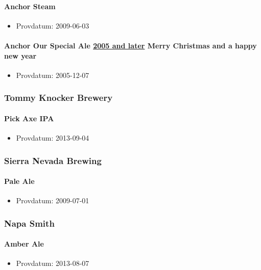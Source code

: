\documentclass[11pt]{article}
\begin{document}
\paragraph{Anchor Steam}
\label{sec:org35a39a7}
\begin{itemize}
\item Provdatum: 2009-06-03
\end{itemize}
\paragraph{Anchor Our Special Ale \underline{2005 and later} Merry Christmas and a happy new year}
\label{sec:org548c026}
\begin{itemize}
\item Provdatum: 2005-12-07
\end{itemize}
\subsubsection{Tommy Knocker Brewery}
\label{sec:org88856ce}
\paragraph{Pick Axe IPA}
\label{sec:org881663c}
\begin{itemize}
\item Provdatum: 2013-09-04
\end{itemize}
\subsubsection{Sierra Nevada Brewing}
\label{sec:org60babb4}
\paragraph{Pale Ale}
\label{sec:orgee734d8}
\begin{itemize}
\item Provdatum: 2009-07-01
\end{itemize}
\subsubsection{Napa Smith}
\label{sec:org0f319ec}
\paragraph{Amber Ale}
\label{sec:org0e7529b}
\begin{itemize}
\item Provdatum: 2013-08-07
\end{itemize}
\end{document}
